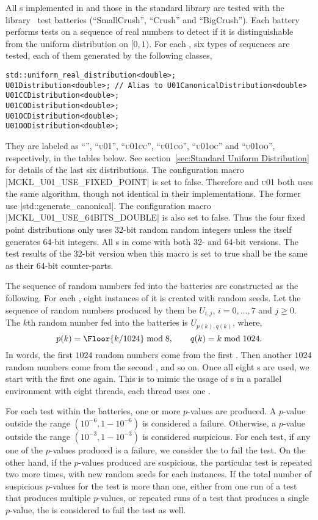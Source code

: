 All \rng{}s implemented in \mckl and those in the standard library are tested
with the \testu library~\cite{Lecuyer:2007hv} test batteries (``SmallCrush'',
``Crush'' and ``BigCrush''). Each battery performs tests on a sequence of real
numbers to detect if it is distinguishable from the uniform distribution on
$[0, 1)$. For each \rng, six types of sequences are tested, each of them
generated by the following classes,
\begin{verbatim}
std::uniform_real_distribution<double>;
U01Distribution<double>; // Alias to U01CanonicalDistribution<double>
U01CCDistribution<double>;
U01CODistribution<double>;
U01OCDistribution<double>;
U01OODistribution<double>;
\end{verbatim}
They are labeled as ``\std'', ``\textsc{u01}'', ``\textsc{u01cc}'',
``\textsc{u01co}'', ``\textsc{u01oc}'' and ``\textsc{u01oo}'', respectively, in
the tables below. See section~\ref{sec:Standard Uniform Distribution} for
details of the last six distributions. The configuration macro
|MCKL_U01_USE_FIXED_POINT| is set to false. Therefore \std and \textsc{u01}
both uses the same algorithm, though not identical in their implementations.
The former use |std::generate_canonical|. The configuration macro
|MCKL_U01_USE_64BITS_DOUBLE| is also set to false. Thus the four fixed point
distributions only uses 32-bit random random integers unless the \rng itself
generates 64-bit integers. All \rng{}s in \mckl come with both 32- and 64-bit
versions. The test results of the 32-bit version when this macro is set to true
shall be the same as their 64-bit counter-parts.

The sequence of random numbers fed into the \testu batteries are constructed as
the following. For each \rng, eight instances of it is created with random
seeds. Let the sequence of random numbers produced by them be $U_{i,j}$, $i =
0,\dots,7$ and $j\ge0$. The $k$th random number fed into the batteries is
$U_{p(k), q(k)}$, where,
\begin{equation*}
  p(k) = \Floor{k / 1024} \bmod 8, \qquad q(k) = k \bmod 1024.
\end{equation*}
In words, the first $1024$ random numbers come from the first \rng. Then
another $1024$ random numbers come from the second \rng, and so on. Once all
eight \rng{}s are used, we start with the first one again. This is to mimic the
usage of \rng{}s in a parallel environment with eight threads, each thread uses
one \rng.

For each test within the batteries, one or more $p$-values are produced. A
$p$-value outside the range $(10^{-6}, 1 - 10^{-6})$ is considered a failure.
Otherwise, a $p$-value outside the range $(10^{-3}, 1 - 10^{-3})$ is considered
suspicious. For each test, if any one of the $p$-values produced is a failure,
we consider the \rng to fail the test. On the other hand, if the $p$-values
produced are suspicious, the particular test is repeated two more times, with
new random seeds for each \rng instances. If the total number of suspicious
$p$-values for the test is more than one, either from one run of a test that
produces multiple $p$-values, or repeated runs of a test that produces a single
$p$-value, the \rng is considered to fail the test as well.

